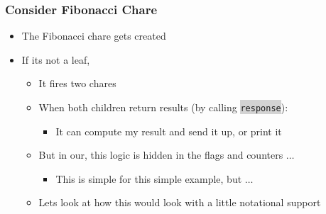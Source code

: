 \documentclass{beamer}
\newcommand{\code}[1]{\colorbox{lightgray}{\texttt{#1}}}
\begin{document}
\begin{frame}
  \frametitle{Consider Fibonacci Chare}
  \begin{itemize}
  \item The Fibonacci chare gets created
  \item If its not a leaf,
    \begin{itemize}
    \item It fires two chares
    \item When both children return results (by calling \code{response}):
      \begin{itemize}
      \item It can compute my result and send it up, or print it
      \end{itemize}
    \item But in our, this logic is hidden in the flags and counters $\ldots$
      \begin{itemize}
      \item This is simple for this simple example, but $\ldots$
      \end{itemize}
    \item Lets look at how this would look with a little notational support
    \end{itemize}
  \end{itemize}
\end{frame}


\end{document}
